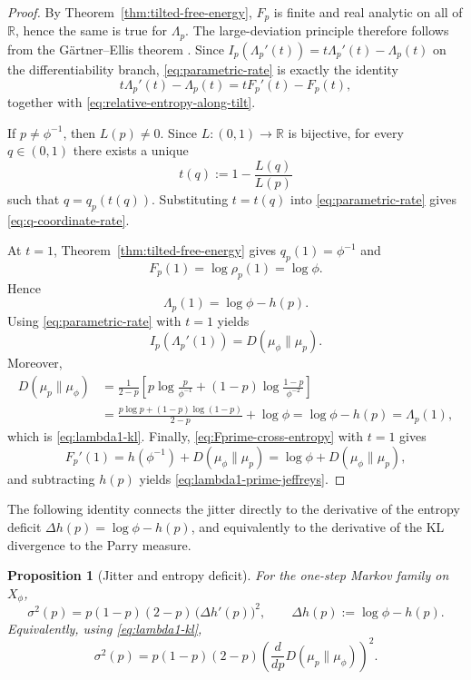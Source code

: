 \documentclass[pdflatex,sn-basic,Numbered]{sn-jnl}
\theoremstyle{thmstyleone}
\newtheorem{proposition}[theorem]{Proposition}
\theoremstyle{thmstyletwo}
\theoremstyle{thmstylethree}
\newcommand{\RR}{\mathbb{R}}
\begin{document}
\begin{proof}
By Theorem~\ref{thm:tilted-free-energy}, $F_p$ is finite and real analytic on all of $\RR$, hence the same is true for $\Lambda_p$. The large-deviation principle therefore follows from the G\"artner--Ellis theorem \cite{DemboZeitouni2010}. Since $I_p(\Lambda_p'(t))=t\Lambda_p'(t)-\Lambda_p(t)$ on the differentiability branch, \eqref{eq:parametric-rate} is exactly the identity
\[
t\Lambda_p'(t)-\Lambda_p(t)=tF_p'(t)-F_p(t),
\]
together with \eqref{eq:relative-entropy-along-tilt}.

If $p\neq \phi^{-1}$, then $L(p)\neq 0$. Since $L:(0,1)\to\RR$ is bijective, for every $q\in(0,1)$ there exists a unique
\[
t(q):=1-\frac{L(q)}{L(p)}
\]
such that $q=q_p(t(q))$. Substituting $t=t(q)$ into \eqref{eq:parametric-rate} gives \eqref{eq:q-coordinate-rate}.

At $t=1$, Theorem~\ref{thm:tilted-free-energy} gives $q_p(1)=\phi^{-1}$ and
\[
F_p(1)=\log\rho_p(1)=\log\phi.
\]
Hence
\[
\Lambda_p(1)=\log\phi-h(p).
\]
Using \eqref{eq:parametric-rate} with $t=1$ yields
\[
I_p(\Lambda_p'(1))=D(\mu_\phi\|\mu_p).
\]
Moreover,
\[
\begin{aligned}
D(\mu_p\|\mu_\phi)
&=
\frac{1}{2-p}
\left[
p\log\frac{p}{\phi^{-1}}
+(1-p)\log\frac{1-p}{\phi^{-2}}
\right] \\
&=
\frac{p\log p+(1-p)\log(1-p)}{2-p}+\log\phi
=
\log\phi-h(p)
=
\Lambda_p(1),
\end{aligned}
\]
which is \eqref{eq:lambda1-kl}. Finally, \eqref{eq:Fprime-cross-entropy} with $t=1$ gives
\[
F_p'(1)=h(\phi^{-1})+D(\mu_\phi\|\mu_p)=\log\phi+D(\mu_\phi\|\mu_p),
\]
and subtracting $h(p)$ yields \eqref{eq:lambda1-prime-jeffreys}.
\end{proof}

The following identity connects the jitter directly to the derivative of the entropy deficit $\Delta h(p)=\log\phi-h(p)$, and equivalently to the derivative of the KL divergence to the Parry measure.

\begin{proposition}[Jitter and entropy deficit]\label{prop:differential-identity}
For the one-step Markov family on $X_\phi$,
\begin{equation}\label{eq:differential-identity}
\sigma^2(p)=p(1-p)(2-p)\,\bigl(\Delta h'(p)\bigr)^2,
\qquad
\Delta h(p):=\log\phi-h(p).
\end{equation}
Equivalently, using \eqref{eq:lambda1-kl},
\begin{equation}\label{eq:differential-identity-kl}
\sigma^2(p)=p(1-p)(2-p)\left(\frac{d}{dp}D(\mu_p\|\mu_\phi)\right)^2.
\end{equation}
\end{proposition}
\end{document}
